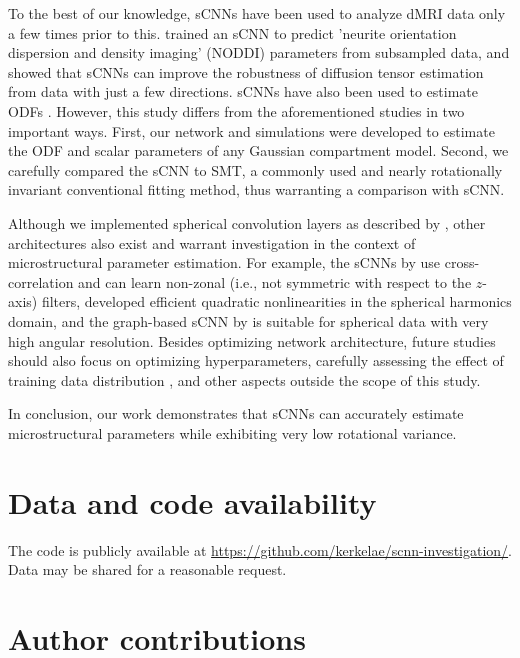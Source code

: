 \documentclass[10pt, letterpaper, oneside]{article}
\begin{document}
To the best of our knowledge, sCNNs have been used to analyze dMRI data only a few times prior to this. \cite{sedlar2021spherical} trained an sCNN to predict 'neurite orientation dispersion and density imaging' (NODDI) \citep{zhang2012noddi} parameters from subsampled data, and \cite{goodwin2022can} showed that sCNNs can improve the robustness of diffusion tensor estimation from data with just a few directions. sCNNs have also been used to estimate ODFs \citep{sedlar2021diffusion, elaldi2021equivariant}. However, this study differs from the aforementioned studies in two important ways. First, our network and simulations were developed to estimate the ODF and scalar parameters of any Gaussian compartment model. Second, we carefully compared the sCNN to SMT, a commonly used and nearly rotationally invariant conventional fitting method, thus warranting a comparison with sCNN.

Although we implemented spherical convolution layers as described by \cite{esteves2018learning}, other architectures also exist and warrant investigation in the context of microstructural parameter estimation. For example, the sCNNs by \cite{cohen2018spherical} use cross-correlation and can learn non-zonal (i.e., not symmetric with respect to the $z$-axis) filters, \cite{kondor2018clebsch} developed efficient quadratic nonlinearities in the spherical harmonics domain, and the graph-based sCNN by \cite{perraudin2019deepsphere} is suitable for spherical data with very high angular resolution. Besides optimizing network architecture, future studies should also focus on optimizing hyperparameters, carefully assessing the effect of training data distribution \citep{gyori2022training}, and other aspects outside the scope of this study.

In conclusion, our work demonstrates that sCNNs can accurately estimate microstructural parameters while exhibiting very low rotational variance.

\newpage

\section*{Data and code availability}

The code is publicly available at \url{https://github.com/kerkelae/scnn-investigation/}. Data may be shared for a reasonable request.

\section*{Author contributions}
\end{document}
